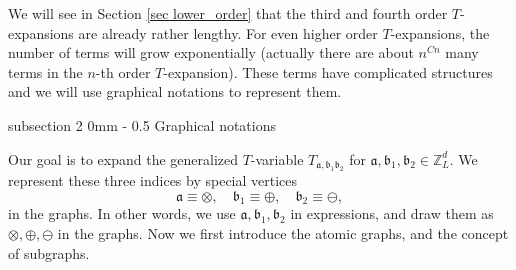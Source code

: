 \documentclass{article}
\makeatletter
\newcommand{\1}{\mathds{1}}
\numberwithin{equation}{section}
\newcommand{\be}{\begin{equation}}
\newcommand{\ee}{\end{equation}}
\newcommand{\fa}{{\mathfrak a}}
\newcommand{\fb}{{\mathfrak b}}
\newcommand{\Z}{\mathbb{Z}}
\theoremstyle{plain} %
\theoremstyle{remark}
\renewcommand{\subsection}{\@startsection
{subsection}%
{2}%
{0mm}%
{-\baselineskip}%
{0.5\baselineskip}%
{\normalfont\bf\itshape}} %
\makeatother
\begin{document}
We  will see in Section \ref{sec lower_order} that the third and fourth order $T$-expansions are already rather lengthy. For even higher order $T$-expansions, the number of terms will grow exponentially (actually there are about $n^{Cn}$ many terms in the $n$-th order $T$-expansion). These terms have complicated structures and we will use graphical notations to represent them. 
 


\subsection{Graphical notations} \label{unisec}

Our goal is to expand the generalized $T$-variable $T_{\fa,\fb_1 \fb_2}$ for $\fa, \fb_1,\fb_2 \in \Z_L^d$. %
We represent these three indices by special vertices
\be\label{rep_abc}\fa\equiv \otimes, \quad \fb_1\equiv \oplus, \quad \fb_2\equiv \ominus,\ee
in the graphs. In other words, we use $\fa,\fb_1,\fb_2$ in expressions, and draw them as $\otimes,\oplus,\ominus$ in the graphs. 
Now we first introduce the atomic graphs, and the concept of subgraphs. %
\end{document}
